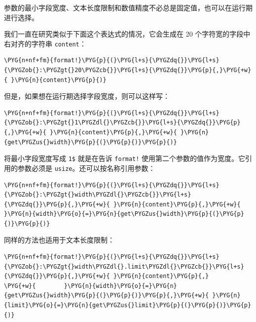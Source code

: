 参数的最小字段宽度、文本长度限制和数值精度不必总是固定值，也可以在运行期进行选择。

我们一直在研究类似于下面这个表达式的情况，它会生成在 20 个字符宽的字段中右对齐的字符串 \texttt{content}：

\begin{Verbatim}[commandchars=\\\{\},breaklines=true,breakanywhere=true,fontsize=\codefont,xleftmargin=17bp]
\PYG{n+nf+fm}{format!}\PYG{p}{(}\PYG{l+s}{\PYGZdq{}}\PYG{l+s}{\PYGZob{}:\PYGZgt{}20\PYGZcb{}}\PYG{l+s}{\PYGZdq{}}\PYG{p}{,}\PYG{+w}{ }\PYG{n}{content}\PYG{p}{)}
\end{Verbatim}

但是，如果想在运行期选择字段宽度，则可以这样写：

\begin{Verbatim}[commandchars=\\\{\},breaklines=true,breakanywhere=true,fontsize=\codefont,xleftmargin=17bp]
\PYG{n+nf+fm}{format!}\PYG{p}{(}\PYG{l+s}{\PYGZdq{}}\PYG{l+s}{\PYGZob{}:\PYGZgt{}1\PYGZdl{}\PYGZcb{}}\PYG{l+s}{\PYGZdq{}}\PYG{p}{,}\PYG{+w}{ }\PYG{n}{content}\PYG{p}{,}\PYG{+w}{ }\PYG{n}{get\PYGZus{}width}\PYG{p}{(}\PYG{p}{)}\PYG{p}{)}
\end{Verbatim}

将最小字段宽度写成 \texttt{1\$} 就是在告诉 \texttt{format!} 使用第二个参数的值作为宽度。它引用的参数必须是 \texttt{usize}。还可以按名称引用参数：

\begin{Verbatim}[commandchars=\\\{\},breaklines=true,breakanywhere=true,fontsize=\codefont,xleftmargin=17bp]
\PYG{n+nf+fm}{format!}\PYG{p}{(}\PYG{l+s}{\PYGZdq{}}\PYG{l+s}{\PYGZob{}:\PYGZgt{}width\PYGZdl{}\PYGZcb{}}\PYG{l+s}{\PYGZdq{}}\PYG{p}{,}\PYG{+w}{ }\PYG{n}{content}\PYG{p}{,}\PYG{+w}{ }\PYG{n}{width}\PYG{o}{=}\PYG{n}{get\PYGZus{}width}\PYG{p}{(}\PYG{p}{)}\PYG{p}{)}
\end{Verbatim}

同样的方法也适用于文本长度限制：

\begin{Verbatim}[commandchars=\\\{\},breaklines=true,breakanywhere=true,fontsize=\codefont,xleftmargin=17bp]
\PYG{n+nf+fm}{format!}\PYG{p}{(}\PYG{l+s}{\PYGZdq{}}\PYG{l+s}{\PYGZob{}:\PYGZgt{}width\PYGZdl{}.limit\PYGZdl{}\PYGZcb{}}\PYG{l+s}{\PYGZdq{}}\PYG{p}{,}\PYG{+w}{ }\PYG{n}{content}\PYG{p}{,}
\PYG{+w}{        }\PYG{n}{width}\PYG{o}{=}\PYG{n}{get\PYGZus{}width}\PYG{p}{(}\PYG{p}{)}\PYG{p}{,}\PYG{+w}{ }\PYG{n}{limit}\PYG{o}{=}\PYG{n}{get\PYGZus{}limit}\PYG{p}{(}\PYG{p}{)}\PYG{p}{)}
\end{Verbatim}

